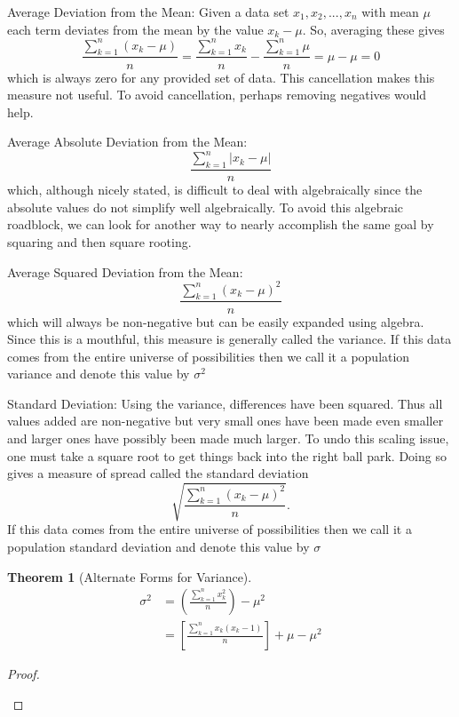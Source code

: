 \documentclass[10pt,]{book}
\theoremstyle{plain}
\newtheorem{theorem}{Theorem}[section]
\theoremstyle{definition}
\theoremstyle{definition}
\numberwithin{equation}{section}
\begin{document}
%
\par

Average Deviation from the Mean:  Given a data set \(x_1, x_2, ... , x_n\) with mean \(\mu\) each term deviates from the mean by the value \(x_k - \mu\). So, averaging these gives
\begin{equation*} \frac{\sum_{k=1}^n (x_k-\mu)}{n} = \frac{\sum_{k=1}^n x_k}{n} - \frac{\sum_{k=1}^n \mu}{n} = \mu - \mu = 0\end{equation*}
which is always zero for any provided set of data. This cancellation makes this measure not useful. To avoid cancellation, perhaps removing negatives would help.
%
\par
Average Absolute Deviation from the Mean:  
\begin{equation*} \frac{\sum_{k=1}^n \left | x_k-\mu \right |}{n} \end{equation*}
which, although nicely stated, is difficult to deal with algebraically since the absolute values do not simplify well algebraically. To avoid this algebraic roadblock, we can look for another way to nearly accomplish the same goal by squaring and then square rooting. 
%
\par
Average Squared Deviation from the Mean:
\begin{equation*} \frac{\sum_{k=1}^n ( x_k-\mu )^2}{n} \end{equation*}
which will always be non-negative but can be easily expanded using algebra. Since this is a mouthful, this measure is generally called the variance. If this data comes from the entire universe of possibilities then we call it a population variance and denote this value by \(\sigma^2\)
%
\par
Standard Deviation: Using the variance, differences have been squared. Thus all values added are non-negative but very small ones have been made even smaller and larger ones have possibly been made much larger. To undo this scaling issue, one must take a square root to get things back into the right ball park. Doing so gives a measure of spread called the standard deviation
\begin{equation*} \sqrt{\frac{\sum_{k=1}^n ( x_k-\mu )^2}{n}}.\end{equation*}
If this data comes from the entire universe of possibilities then we call it a population standard deviation and denote this value by \(\sigma\)
%
\begin{theorem}[Alternate Forms for Variance]\label{theorem-7}
\begin{align*}
\sigma^2 & = \left ( \frac{\sum_{k=1}^n x_k^2 }{n} \right ) - \mu^2 \\
& = \left [ \frac{\sum_{k=1}^n x_k(x_k - 1)}{n} \right ] + \mu - \mu^2
\end{align*}\end{theorem}
\begin{proof}\hypertarget{proof-4}{}
\end{proof}
\par
\end{document}

